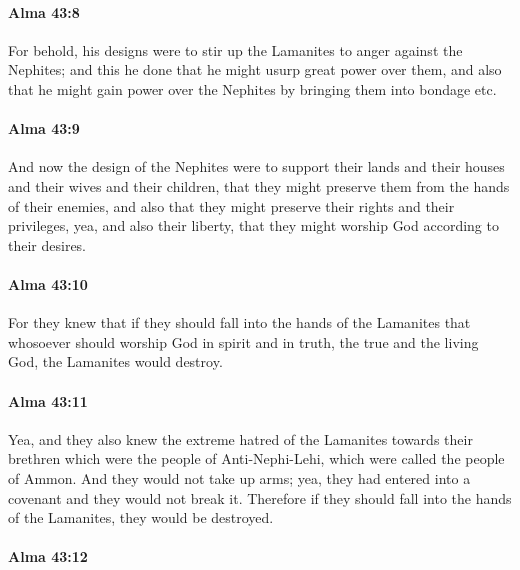 		\paragraph{Alma 43:8} %
			\label{ALMA-43-8}

			For behold, his designs were to stir up the Lamanites to anger against the Nephites;
			and this he done that he might usurp great power over them,
			and also that he might gain power over the Nephites
			by bringing them into bondage etc.

		\paragraph{Alma 43:9} %
			\label{ALMA-43-9}

			And now the design of the Nephites were to support their lands and their houses
			and their wives and their children,
			that they might preserve them from the hands of their enemies,
			and also that they might preserve their rights and their privileges,
			yea, and also their liberty,
			that they might worship God according to their desires.

		\paragraph{Alma 43:10} %
			\label{ALMA-43-10}

			For they knew that if they should fall into the hands of the Lamanites
			that whosoever should worship God in spirit and in truth,
			the true and the living God,
			the Lamanites would destroy.

		\paragraph{Alma 43:11} %
			\label{ALMA-43-11}

			Yea, and they also knew the extreme hatred of the Lamanites
			towards their brethren which were the people of Anti-Nephi-Lehi,
			which were called the people of Ammon.
			And they would not take up arms;
			yea, they had entered into a covenant and they would not break it.
			Therefore if they should fall into the hands of the Lamanites,
			they would be destroyed.

		\paragraph{Alma 43:12} %
			\label{ALMA-43-12}

